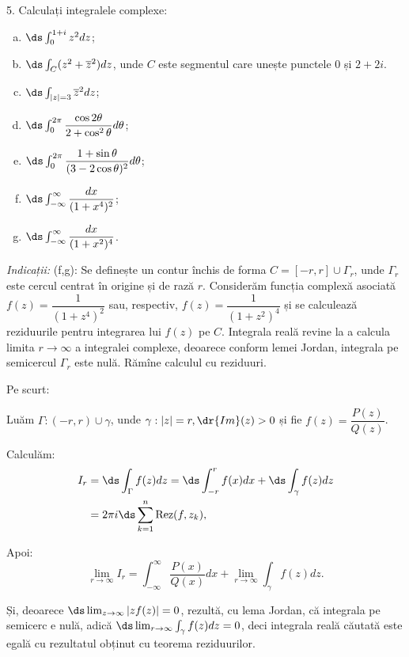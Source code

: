 5. Calculați integralele complexe:
\begin{enumerate}[(a)]
    \item $ \ds\int_0^{1 + i} z^2 dz $;
    \item $ \ds\int_C (z^2 + \overline{z}^2) dz $, unde $ C $ este segmentul
        care unește punctele $ 0 $ și $ 2 + 2i $.
    \item $ \ds\int_{|z| = 3} \overline{z}^2 dz $;
    \item $ \ds\int_0^{2\pi} \dfrac{\cos 2\theta}{2 + \cos^2 \theta} d\theta $;
    \item $ \ds\int_0^{2\pi} \dfrac{1 + \sin \theta}{(3 - 2 \cos\theta)^2} d\theta $;
    \item $ \ds\int_{-\infty}^\infty \dfrac{dx}{(1 + x^4)^2} $;
    \item $ \ds\int_{-\infty}^\infty \dfrac{dx}{(1 + x^2)^4} $.
\end{enumerate}

\vspace{0.3cm}

\emph{Indicații:} (f,g): Se definește un contur închis de forma $ C = [-r,r] \cup \Gamma_r $, unde
$ \Gamma_r $ este cercul centrat în origine și de rază $ r $. Considerăm funcția complexă asociată
$ f(z) = \dfrac{1}{(1 + z^4)^2} $ sau, respectiv, $ f(z) = \dfrac{1}{(1 + z^2)^4} $ și se calculează
reziduurile pentru integrarea lui $ f(z) $ pe $ C $. Integrala reală revine la a calcula limita
$ r \to \infty $ a integralei complexe, deoarece conform lemei Jordan, integrala pe semicercul $ \Gamma_r $
este nulă. Rămîne calculul cu reziduuri.

Pe scurt:

Luăm $ \Gamma: (-r, r) \cup \gamma $, unde $ \gamma: |z| = r, \dr{Im}(z) > 0 $ și fie
$ f(z) = \dfrac{P(z)}{Q(z)} $.

Calculăm:
\begin{align*}
    I_r &= \ds\int_\Gamma f(z) dz = \ds\int_{-r}^r f(x) dx + \ds\int_\gamma f(z) dz \\
        &= 2 \pi i \ds\sum_{k=1}^n \mathrm{Rez}(f, z_k),
\end{align*}

Apoi:
\[
    \lim_{r \to \infty} I_r = \int_{-\infty}^\infty \dfrac{P(x)}{Q(x)} dx + \lim_{r \to \infty} \int_\gamma f(z) dz.
\]

Și, deoarece $ \ds\lim_{z \to \infty} |z f(z)| = 0 $, rezultă, cu lema Jordan, că 
integrala pe semicerc e nulă, adică $ \ds\lim_{r \to \infty} \int_\gamma f(z) dz = 0 $,
deci integrala reală căutată este egală cu rezultatul obținut cu teorema reziduurilor.
